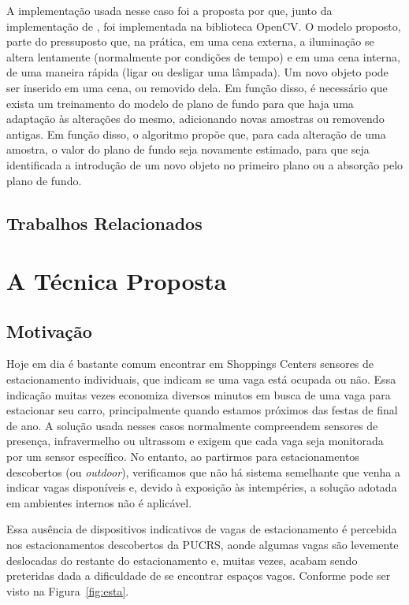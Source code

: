 \documentclass[ecp,tc]{iiufrgs}
\begin{document}
A implementação usada nesse caso foi a proposta por  que, junto da implementação de , foi implementada na biblioteca OpenCV. O modelo proposto, parte do pressuposto que, na prática, em uma cena externa, a iluminação se altera lentamente (normalmente por condições de tempo) e em uma cena interna, de uma maneira rápida (ligar ou desligar uma lâmpada). Um novo objeto pode ser inserido em uma cena, ou removido dela. Em função disso, é necessário que exista um treinamento do modelo de plano de fundo para que haja uma adaptação às alterações do mesmo, adicionando novas amostras ou removendo antigas. Em função disso, o algoritmo propõe que, para cada alteração de uma amostra, o valor do plano de fundo seja novamente estimado, para que seja identificada a introdução de um novo objeto no primeiro plano ou a absorção pelo plano de fundo.

\section{Trabalhos Relacionados}

\chapter{A Técnica Proposta}

\section{Motivação}

Hoje em dia é bastante comum encontrar em Shoppings Centers sensores de estacionamento individuais, que indicam se uma vaga está ocupada ou não. Essa indicação muitas vezes economiza diversos minutos em busca de uma vaga para estacionar seu carro, principalmente quando estamos próximos das festas de final de ano. A solução usada nesses casos normalmente compreendem sensores de presença, infravermelho ou ultrassom e exigem que cada vaga seja monitorada por um sensor específico. No entanto, ao partirmos para estacionamentos descobertos (ou \textit{outdoor}), verificamos que não há sistema semelhante que venha a indicar vagas disponíveis e, devido à exposição às intempéries, a solução adotada em ambientes internos não é aplicável.

Essa ausência de dispositivos indicativos de vagas de estacionamento é percebida nos estacionamentos descobertos da PUCRS, aonde algumas vagas são levemente deslocadas do restante do estacionamento e, muitas vezes, acabam sendo preteridas dada a dificuldade de se encontrar espaços vagos. Conforme pode ser visto na Figura~\ref{fig:esta}.
\end{document}
